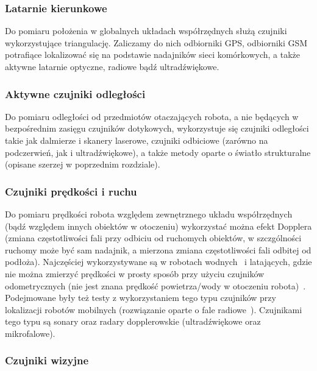 \subsubsection{Latarnie kierunkowe}

Do pomiaru położenia w globalnych układach współrzędnych służą czujniki
wykorzystujące triangulację. Zaliczamy do nich odbiorniki GPS, odbiorniki GSM
potrafiące lokalizować się na podstawie nadajników sieci komórkowych, a także
aktywne latarnie optyczne, radiowe bądź ultradźwiękowe.

\subsubsection{Aktywne czujniki odległości}

Do pomiaru odległości od przedmiotów otaczających robota, a nie będących
w bezpośrednim zasięgu czujników dotykowych, wykorzystuje się czujniki odległości
takie jak dalmierze i skanery laserowe, czujniki odbiciowe (zarówno na podczerwień, 
jak i ultradźwiękowe), a także metody oparte o światło strukturalne (opisane szerzej
w poprzednim rozdziale).

\subsubsection{Czujniki prędkości i ruchu}

Do pomiaru prędkości robota względem zewnętrznego układu współrzędnych (bądź
względem innych obiektów w otoczeniu) wykorzystać można efekt Dopplera (zmiana
częstotliwości fali przy odbiciu od ruchomych obiektów, w szczgólności ruchomy 
może być sam nadajnik, a mierzona zmiana częstotliwości fali odbitej od podłoża).
Najczęściej wykorzystywane są w robotach wodnych~\cite{doppler_underwater} i latających, gdzie nie 
można zmierzyć prędkości w prosty sposób przy użyciu czujników odometrycznych
(nie jest znana prędkość powietrza/wody w otoczeniu robota)~\cite{whereami}.
Podejmowane były też testy z wykorzystaniem tego typu czujników przy lokalizacji
robotów mobilnych (rozwiązanie oparte o fale radiowe~\cite{doppler_mobilesensor}).
Czujnikami tego typu są sonary oraz radary dopplerowskie (ultradźwiękowe
oraz mikrofalowe).

\subsubsection{Czujniki wizyjne}

